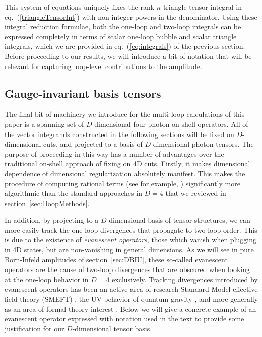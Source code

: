 \documentclass[12pt,letter]{article}
\def\sect#1{section~\ref{#1}}
\def\sec#1{section~\ref{#1}}
\def\eqn#1{eq.~(\ref{#1})}
\begin{document}
This system of equations uniquely fixes the rank-$n$ triangle tensor integral in \eqn{triangleTensorInt} with non-integer powers in the denominator. Using these integral reduction formulae, both the one-loop and two-loop integrals can be expressed completely in terms of scalar one-loop bubble and scalar triangle integrals, which we are provided in \eqn{eq:integrals} of the previous section. Before proceeding to our results, we will introduce a bit of notation that will be relevant for capturing loop-level contributions to the amplitude. 

\subsection{Gauge-invariant basis tensors}\label{sec:basisT}
The final bit of machinery we introduce for the multi-loop calculations of this paper is a spanning set of $D$-dimensional four-photon on-shell operators. All of the vector integrands constructed in the following sections will be fixed on $D$-dimensional cuts, and projected to a basis of $D$-dimensional photon tensors. The purpose of proceeding in this way has a number of advantages over the traditional on-shell approach of fixing on 4D cuts. Firstly, it makes dimensional dependence of dimensional regularization absolutely manifest. This makes the procedure of computing rational terms (see for example, \cite{Badger:2008cm}) significantly more algorithmic than the standard approaches in $D=4$ that we reviewed in \sect{sec:1loopMethods}. 

In addition, by projecting to a $D$-dimensional basis of tensor structures, we can more easily track the one-loop divergences that propagate to two-loop order. This is due to the existence of \textit{evanescent operators}, those which vanish when plugging in 4D states, but are non-vanishing in general dimensions. As we will see in pure Born-Infeld amplitudes of \sec{sec:DBIU}, these so-called evanescent operators are the cause of two-loop divergences that are obscured when looking at the one-loop behavior in $D=4$ exclusively. Tracking divergences introduced by evanescent operators has been an active area of research Standard Model effective field theory (SMEFT) \cite{Hartmann:2016pil,Chala:2021cgt,Aebischer:2022tvz,Fuentes-Martin:2022vvu,Isidori:2023pyp}, the UV behavior of quantum gravity \cite{Bern:2015xsa,Bern:2017tuc,Bern:2017puu}, and more generally as an area of formal theory interest \cite{Dugan:1990df,Herrlich:1994kh,Bell:2009nk,Becher:2004kk,DiPietro:2017vsp}. Below we will give a concrete example of an evanescent operator expressed with notation used in the text to provide some justification for our $D$-dimensional tensor basis. 
\end{document}
